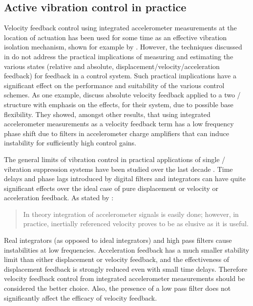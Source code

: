 \documentclass[11pt,a4paper]{memoir}
\begin{document}
\subsection{Active vibration control in practice}

Velocity feedback control using integrated accelerometer measurements at the location of actuation has been used for some time as an effective vibration isolation mechanism, shown for example by \textcite{kim1999}.
However, the techniques discussed in  do not address the practical implications of measuring and estimating the various states (relative and absolute, displacement/velocity/acceleration feedback) for feedback in a control system.
Such practical implications have a significant effect on the performance and suitability of the various control schemes.
As one example, \textcite{serrand2000} discuss absolute velocity feedback applied to a two \dof/ structure with emphasis on the effects, for their system, due to possible base flexibility.
They showed, amongst other results, that using integrated accelerometer measurements as a velocity feedback term has a low frequency phase shift due to filters in accelerometer charge amplifiers that can induce instability for sufficiently high control gains.

The general limits of vibration control in practical applications of single \dof/ vibration suppression systems have been studied over the last decade \cite{ananthaganeshan2001,brennan2007-jsv}. Time delays and phase lags introduced by digital filters
and integrators can have quite significant effects over the ideal case of pure displacement or velocity or acceleration feedback.
As stated by \textcite{williams2009}:
\begin{quote}
In theory integration of accelerometer signals is easily done; however, in practice, inertially referenced velocity proves to be as \mbox{elusive} as it is useful.
\end{quote}
Real integrators (as opposed to ideal integrators) and high pass filters cause instabilities at low frequencies.
Acceleration feedback has a much smaller stability limit than either displacement or velocity feedback, and the effectiveness of displacement feedback is strongly reduced even with small time delays.
Therefore velocity feedback control from integrated accelerometer measurements should be considered the better choice.
Also, the presence of a low pass filter does not significantly affect the efficacy of velocity feedback.
\end{document}
